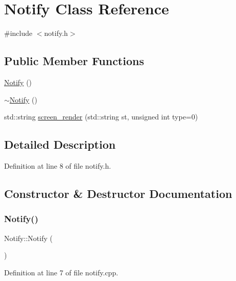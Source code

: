 \hypertarget{class_notify}{}\section{Notify Class Reference}
\label{class_notify}


{\ttfamily \#include $<$notify.\+h$>$}

\subsection*{Public Member Functions}
\begin{DoxyCompactItemize}
\item 
\mbox{\hyperlink{class_notify_a76566a48401667bd9382a169c2a76ed2}{Notify}} ()
\item 
\mbox{\hyperlink{class_notify_a621d36ca663f0c8460c82611c708b51e}{$\sim$\+Notify}} ()
\item 
std\+::string \mbox{\hyperlink{class_notify_a7055e1a2409ac4f55021e171ce6942e1}{screen\+\_\+render}} (std\+::string st, unsigned int type=0)
\end{DoxyCompactItemize}


\subsection{Detailed Description}


Definition at line 8 of file notify.\+h.



\subsection{Constructor \& Destructor Documentation}
\mbox{\label{class_notify_a76566a48401667bd9382a169c2a76ed2}} 
\subsubsection{\texorpdfstring{Notify()}{Notify()}}
{\footnotesize\ttfamily Notify\+::\+Notify (\begin{DoxyParamCaption}{ }\end{DoxyParamCaption})}



Definition at line 7 of file notify.\+cpp.

\mbox{\label{class_notify_a621d36ca663f0c8460c82611c708b51e}} 
